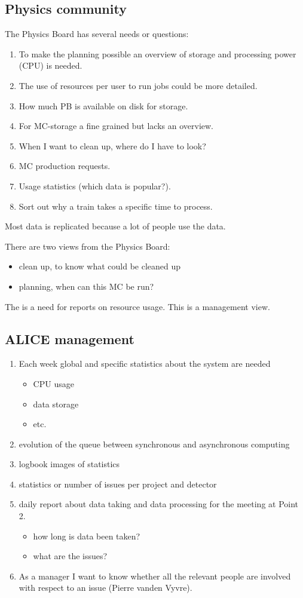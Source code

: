 \subsection{Physics community}
The Physics Board has several needs or questions:
\begin{enumerate}
  \item To make the planning possible an overview of storage and processing power (CPU) is needed. 
  \item The use of resources per user to run jobs could be more detailed.
  \item How much PB is available on disk for storage.
  \item For MC-storage a fine grained but lacks an overview.
  \item When I want to clean up, where do I have to look?
  \item MC production requests.
  \item Usage statistics (which data is popular?).
  \item Sort out why a train takes a specific time to process.
\end{enumerate}
Most data is replicated because a lot of people use the data.

There are two views from the Physics Board:
\begin{itemize}
  \item clean up, to know what could be cleaned up
  \item planning, when can this MC be run?
\end{itemize}
The is a need for reports on resource usage. This is a management view.

\subsection{ALICE management}
\begin{enumerate}
  \item Each week global and specific statistics about the system are needed
  \begin{itemize}
    \item CPU usage
    \item data storage
    \item etc.
  \end{itemize}
  \item evolution of the queue between synchronous and asynchronous computing
  \item logbook images of statistics
  \item statistics or number of issues per project and detector
  \item daily report about data taking and data processing for the meeting at Point 2.
  \begin{itemize}
    \item how long is data been taken?
    \item what are the issues?
  \end{itemize}
  \item As a manager I want to know whether all the relevant people are involved with respect to an issue (Pierre vanden Vyvre).
\end{enumerate}


